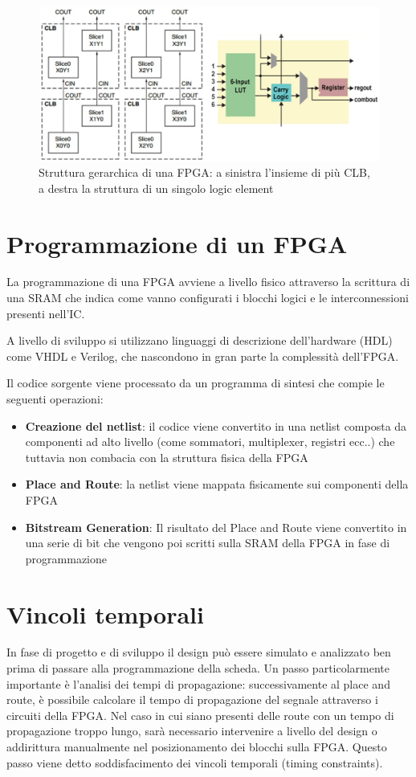 \begin{figure}[H]
	\centering
	\def\svgwidth{\columnwidth}
	\includegraphics[width=0.8\columnwidth]{TeX_files/CLB.png}
    \caption{Struttura gerarchica di una FPGA: a sinistra l'insieme di più CLB,
    a destra la struttura di un singolo logic element}
\end{figure}

\section{Programmazione di un FPGA}
La programmazione di una FPGA avviene a livello fisico attraverso
la scrittura di una SRAM che indica come vanno configurati i blocchi
logici e le interconnessioni presenti nell'IC.

A livello di sviluppo si utilizzano linguaggi di descrizione dell'hardware
(HDL) come VHDL e Verilog, che nascondono in gran parte la complessità
dell'FPGA.

Il codice sorgente viene processato da un programma di sintesi che compie le seguenti operazioni:

\begin{itemize}
    \item \textbf{Creazione del netlist}: il codice viene convertito in una
          netlist composta da componenti ad alto livello (come sommatori,
          multiplexer, registri ecc..) che tuttavia non combacia
          con la struttura fisica della FPGA
    \item \textbf{Place and Route}: la netlist viene mappata fisicamente sui
          componenti della FPGA
    \item \textbf{Bitstream Generation}: Il risultato del Place and Route viene
          convertito in una serie di bit che vengono poi scritti sulla SRAM
          della FPGA in fase di programmazione
\end{itemize}

\section{Vincoli temporali}
In fase di progetto e di sviluppo il design può essere simulato e analizzato
ben prima di passare alla programmazione della scheda.
Un passo particolarmente importante è l'analisi dei tempi di propagazione:
successivamente al place and route, è possibile calcolare il tempo di propagazione
del segnale attraverso i circuiti della FPGA. Nel caso in cui siano presenti
delle route con un tempo di propagazione troppo lungo, sarà necessario
intervenire a livello del design o addirittura manualmente nel posizionamento
dei blocchi sulla FPGA.
Questo passo viene detto soddisfacimento dei vincoli temporali (timing constraints).

